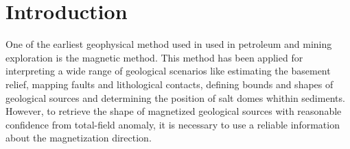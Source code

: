\section{Introduction}

One of the earliest geophysical method used in used in petroleum and mining exploration is the magnetic method. This method has been applied for interpreting a wide range of geological scenarios like estimating the basement relief, mapping faults and lithological contacts, defining bounds and shapes of geological sources and determining the position of salt domes whithin sediments. However, to retrieve the shape of magnetized geological sources with reasonable confidence from total-field anomaly, it is necessary to use a reliable information about the magnetization direction. 

